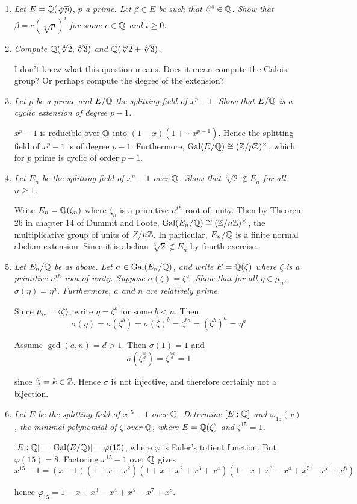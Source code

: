 \documentclass[10pt]{article}
\begin{document}
\begin{enumerate}
\item \emph{Let $E = \mathbb{Q}(\sqrt[4]{p})$, $p$ a prime.  Let $\beta \in E$ be such that $\beta^4 \in \mathbb{Q}$.  Show that $\beta = c(\sqrt[4]{p})^i$ for some $c \in \mathbb{Q}$ and $i \geq 0$.}

\item \emph{Compute $\mathbb{Q}(\sqrt[4]{2}, \sqrt[4]{3})$ and $\mathbb{Q}(\sqrt[4]{2} + \sqrt[4]{3})$.}

I don't know what this question means.  Does it mean compute the Galois group?  Or perhaps compute the degree of the extension?

\item \emph{Let $p$ be a prime and $E/\mathbb{Q}$ the splitting field of $x^p-1$.  Show that $E/\mathbb{Q}$ is a cyclic extension of degree $p-1$.}

$x^p-1$ is reducible over $\mathbb{Q}$ into $(1-x)(1 + \cdots x^{p-1})$.  Hence the splitting field of $x^p-1$ is of degree $p-1$.  Furthermore, $\operatorname{Gal}(E/\mathbb{Q}) \cong (\mathbb{Z}/p\mathbb{Z})^\times$, which for $p$ prime is cyclic of order $p-1$.

\item \emph{Let $E_n$ be the splitting field of $x^n-1$ over $\mathbb{Q}$.  Show that $\sqrt[3]{2} \notin E_n$ for all $n \geq 1$.}

Write $E_n = \mathbb{Q}(\zeta_n)$ where $\zeta_n$ is a primitive $n^{th}$ root of unity.  Then by Theorem 26 in chapter 14 of Dummit and Foote, $\operatorname{Gal}(E_n/\mathbb{Q}) \cong (\mathbb{Z}/n\mathbb{Z})^\times$, the multiplicative group of units of $Z/n\mathbb{Z}$.  In particular, $E_n/\mathbb{Q}$ is a finite normal abelian extension.  Since it is abelian $\sqrt[3]{2} \notin E_n$ by fourth exercise.

\item \emph{Let $E_n/\mathbb{Q}$ be as above.  Let $\sigma \in \operatorname{Gal}(E_n/\mathbb{Q})$, and write $E = \mathbb{Q}(\zeta)$ where $\zeta$ is a primitive $n^{th}$ root of unity.  Suppose $\sigma(\zeta) = \zeta^a$.  Show that for all $\eta \in \mu_n$, $\sigma(\eta) = \eta^a$.  Furthermore, $a$ and $n$ are relatively prime.}

Since $\mu_n = \left\langle \zeta \right\rangle$, write $\eta = \zeta^b$ for some $b < n$.  Then 
\[
\sigma(\eta) = \sigma(\zeta^b) = \sigma(\zeta)^b = \zeta^{ba} = \left(\zeta^b\right)^a = \eta^a
\]

Assume $\gcd(a,n) = d > 1$.  Then $\sigma(1) = 1$ and
\[
\sigma(\zeta^{\frac{n}{d}}) = \zeta^{\frac{na}{d}} = 1
\]

since $\frac{a}{d} = k \in \mathbb{Z}$.  Hence $\sigma$ is not injective, and therefore certainly not a bijection.

\item \emph{Let $E$ be the splitting field of $x^{15} - 1$ over $\mathbb{Q}$.  Determine $[E:\mathbb{Q}]$ and $\varphi_{15}(x)$, the minimal polynomial of $\zeta$ over $\mathbb{Q}$, where $E = \mathbb{Q}(\zeta)$ and $\zeta^{15} = 1$.}

$[E:\mathbb{Q}] = \left| \operatorname{Gal}(E/\mathbb{Q}) \right| = \varphi(15)$, where $\varphi$ is Euler's totient function.  But $\varphi(15) = 8$.  Factoring $x^{15} - 1$ over $\mathbb{Q}$ gives
\[
x^{15} - 1 = (x-1)(1 + x + x^2)(1 + x + x^2 + x^3 + x^4)(1 - x + x^3 - x^4 + x^5 - x^7 + x^8)
\]

hence $\varphi_{15} = 1 - x + x^3 - x^4 + x^5 - x^7 + x^8$.

\end{enumerate}
\end{document}
